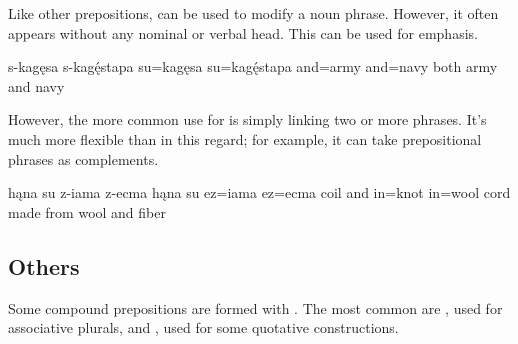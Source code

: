 Like other prepositions,  can be used to modify a noun phrase. However, it often appears without any nominal or verbal head. This can be used for emphasis.

\begin{example}
    \script s-kagęsa s-kagę́stapa
    \bits su=kagęsa su=kagę́stapa
    \gloss and=army and=navy
    \tr both army and navy
\end{example}

However, the more common use for  is simply linking two or more phrases. It's much more flexible than  in this regard; for example, it can take prepositional phrases as complements.

\begin{example}
    \script hąna su z-iama z-ecma
    \bits hąna su ez=iama ez=ecma
    \gloss coil and in=knot in=wool
    \tr cord made from wool and fiber
\end{example}

\subsection{Others}
Some compound prepositions are formed with . The most common are , used for associative plurals, and , used for some quotative constructions.